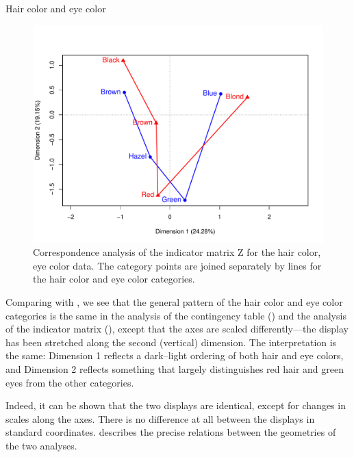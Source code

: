 \documentclass[11pt]{book}
\renewenvironment{knitrout}{\small\renewcommand{\baselinestretch}{.85}}{} %
\begin{document}
\begin{Example}[haireye4]{Hair color and eye color}
\begin{knitrout}
\begin{figure}[!htbp]
\centerline{\includegraphics[width=.8\textwidth]{ch06/fig/mca-haireye1} }

\caption[Correspondence analysis of the indicator matrix Z for the hair color, eye color data]{Correspondence analysis of the indicator matrix Z for the hair color, eye color data. The category points are joined separately by lines for the hair color and eye color categories.\label{fig:mca-haireye1}}
\end{figure}


\end{knitrout}

Comparing 
with , we see that the general pattern of
the hair color and eye color categories is the same in the analysis of
the contingency table () and the analysis of the
indicator matrix (), except that the axes are scaled
differently---the display has been stretched along the second (vertical)
dimension.
The interpretation is the same: Dimension 1 reflects a dark--light ordering
of both hair and eye colors, and Dimension 2 reflects something that largely
distinguishes red hair and green eyes from the other categories.

Indeed, it can be shown \citep{Greenacre:84,Greenacre:2007}
that the two displays are identical, except for changes in scales along
the axes.
There is no difference at all between the displays in standard coordinates.
\citet[pp. 130--134]{Greenacre:84} describes the precise relations
between the geometries of the two analyses.

\end{Example}
\end{document}
